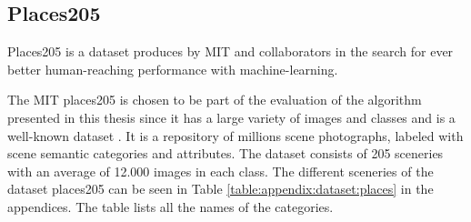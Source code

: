 \subsection{Places205}
\label{sec:theory:dataset:places}
Places205 is a dataset produces by MIT and collaborators in the search for ever better human-reaching performance with machine-learning. 

The MIT places205 is chosen to be part of the evaluation of the algorithm presented in this thesis since it has a large variety of images and classes and is a well-known dataset \cite{zhou2016places}. It is a repository of millions scene photographs, labeled with scene semantic categories and attributes. The dataset consists of 205 sceneries with an average of 12.000 images in each class. 
The different sceneries of the dataset places205 can be seen in Table \ref{table:appendix:dataset:places} in the appendices. The table lists all the names of the categories. 

